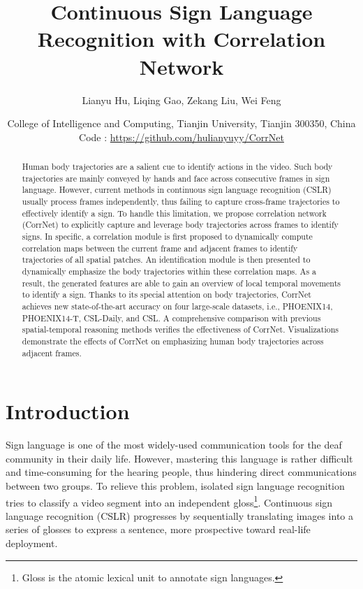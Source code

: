 \documentclass[10pt,twocolumn,letterpaper]{article}
\begin{document}
\title{Continuous Sign Language Recognition with Correlation Network}

\author{Lianyu Hu, Liqing Gao, Zekang Liu, Wei Feng\textsuperscript{\Envelope}
\and
College of Intelligence and Computing, Tianjin University, Tianjin 300350, China\\
Code : \url{https://github.com/hulianyuyy/CorrNet}
}
\maketitle

\begin{abstract}
Human body trajectories are a salient cue to identify actions in the video. Such body trajectories are mainly conveyed by hands and face across consecutive frames in sign language. However, current methods in continuous sign language recognition (CSLR) usually process frames independently, thus failing to capture cross-frame trajectories to effectively identify a sign. To handle this limitation, we propose correlation network (CorrNet) to explicitly capture and leverage body trajectories across frames to identify signs. In specific, a correlation module is first proposed to dynamically compute correlation maps between the current frame and adjacent frames to identify trajectories of all spatial patches. An identification module is then presented to dynamically emphasize the body trajectories within these correlation maps.  As a result, the generated features are able to gain an overview of local temporal movements to identify a sign. Thanks to its special attention on body trajectories, CorrNet achieves new state-of-the-art accuracy on four large-scale datasets, i.e., PHOENIX14, PHOENIX14-T, CSL-Daily, and CSL. A comprehensive comparison with previous spatial-temporal reasoning methods verifies the effectiveness of CorrNet. Visualizations demonstrate the effects of CorrNet on emphasizing human body trajectories across adjacent frames.
\end{abstract}

\section{Introduction}
Sign language is one of the most widely-used communication tools for the deaf community in their daily life. However, mastering this language is rather difficult and time-consuming for the hearing people, thus hindering direct communications between two groups. To relieve this problem, isolated sign language recognition tries to classify a video segment into an independent gloss\footnote{Gloss is the atomic lexical unit to annotate sign languages.}. Continuous sign language recognition (CSLR) progresses by sequentially translating images into a series of glosses to express a sentence, more prospective toward real-life deployment. 
\end{document}
